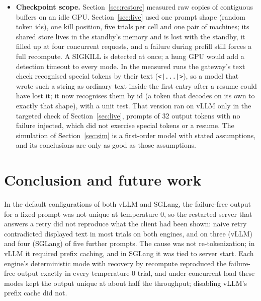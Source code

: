 \documentclass[10pt,twocolumn]{article}
\begin{document}
\begin{itemize}
    (Llama~3.1~8B~Instruct), one GPU type (A10G, one per machine), one cloud
    and machine image, two engine versions, and, for the gateway and
    checkpoints, one prompt or one synthetic prompt shape. Larger models with
    tensor or pipeline parallelism have more state to lose, longer restarts
    and different kernels; other GPUs differ in memory and copy bandwidth,
    which moves every recompute-versus-copy ratio; and engines change
    quickly, so the specific behaviours found here (the prefix-cache
    dependence, the start-dependent output, the echoed text) may be fixed or
    replaced in later versions. The delivery problem and the gateway's
    protocol do not depend on these details; the numbers do.
\item \textbf{Checkpoint scope.} Section~\ref{sec:restore} measured raw
    copies of contiguous buffers on an idle GPU. Section~\ref{sec:live} used
    one prompt shape (random token ids), one kill position, five trials per
    cell and one pair of machines; its shared store lives in the standby's
    memory and is lost with the standby, it filled up at four concurrent
    requests, and a failure during prefill still forces a full recompute. A
    SIGKILL is detected at once; a hung GPU would add a detection timeout to
    every mode. In the measured runs the gateway's text check recognised
    special tokens by their text (\texttt{<|...|>}), so a model that wrote
    such a string as ordinary text inside the first entry after a resume could
    have lost it; it now recognises them by id (a token that decodes on its
    own to exactly that shape), with a unit test. That version ran on vLLM
    only in the targeted check of Section~\ref{sec:live}, \TbPrompts{} prompts
    of 32 output tokens with no failure injected, which did not exercise
    special tokens or a resume. The simulation of Section~\ref{sec:sim} is a first-order
    model with stated assumptions, and its conclusions are only as good as
    those assumptions.
\end{itemize}

\section{Conclusion and future work}

In the default configurations of both vLLM and SGLang, the failure-free
output for a fixed prompt was not unique at temperature 0, so the restarted
server that answers a retry did not reproduce what the client had been
shown: naive retry contradicted displayed text in most trials on both
engines, and on three (vLLM) and four (SGLang) of five further prompts. The
cause was not re-tokenization; in vLLM it required prefix caching, and in
SGLang it was tied to server start. Each engine's deterministic mode with
recovery by recompute reproduced the failure-free output exactly in every
temperature-0 trial, and under concurrent load these modes kept the output
unique at about half the throughput; disabling vLLM's prefix cache did not.
\end{document}
